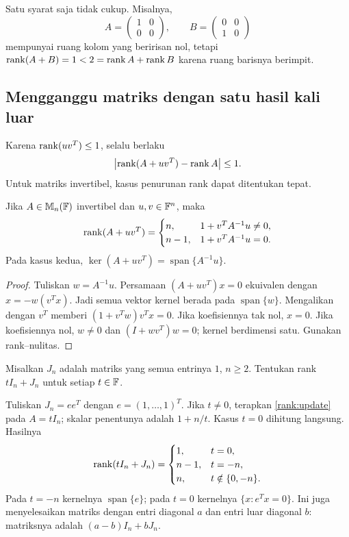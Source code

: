 Satu syarat saja tidak cukup. Misalnya,
\[
    A=\begin{pmatrix}1&0\\0&0\end{pmatrix},\qquad
    B=\begin{pmatrix}0&0\\1&0\end{pmatrix}
\]
mempunyai ruang kolom yang beririsan nol, tetapi
$\operatorname{rank}(A+B)=1<2=\operatorname{rank} A+\operatorname{rank} B$ karena ruang barisnya berimpit.

\subsection{Mengganggu matriks dengan satu hasil kali luar}

Karena $\operatorname{rank}(uv^T)\le1$, selalu berlaku
\[
    \bigl|\operatorname{rank}(A+uv^T)-\operatorname{rank} A\bigr|\le1.
\]
Untuk matriks invertibel, kasus penurunan rank dapat ditentukan tepat.

\begin{prop}
    \label{rank:update}
    Jika $A\in\mathbb{M}_n(\mathbb{F})$ invertibel dan $u,v\in\mathbb{F}^n$, maka
    \[
        \operatorname{rank}(A+uv^T)=
        \begin{cases}
            n,&1+v^TA^{-1}u\ne0,\\
            n-1,&1+v^TA^{-1}u=0.
        \end{cases}
    \]
    Pada kasus kedua, $\ker(A+uv^T)=\operatorname{span}\{A^{-1}u\}$.
\end{prop}
\begin{proof}
    Tuliskan $w=A^{-1}u$. Persamaan $(A+uv^T)x=0$ ekuivalen dengan
    $x=-w(v^Tx)$. Jadi semua vektor kernel berada pada
    $\operatorname{span}\{w\}$. Mengalikan dengan $v^T$ memberi
    $(1+v^Tw)v^Tx=0$.
    Jika koefisiennya tak nol, $x=0$.
    Jika koefisiennya nol, $w\ne0$ dan $(I+wv^T)w=0$;
    kernel berdimensi satu. Gunakan rank--nulitas.
\end{proof}

\begin{exam}
    Misalkan $J_n$ adalah matriks yang semua entrinya $1$, $n\ge2$.
    Tentukan rank $tI_n+J_n$ untuk setiap $t\in\mathbb{F}$.
\end{exam}
\begin{solution}
    Tuliskan $J_n=ee^T$ dengan $e=(1,\ldots,1)^T$.
    Jika $t\ne0$, terapkan \autoref{rank:update} pada $A=tI_n$;
    skalar penentunya adalah $1+n/t$.
    Kasus $t=0$ dihitung langsung. Hasilnya
    \[
        \operatorname{rank}(tI_n+J_n)=
        \begin{cases}
            1,&t=0,\\
            n-1,&t=-n,\\
            n,&t\notin\{0,-n\}.
        \end{cases}
    \]
    Pada $t=-n$ kernelnya $\operatorname{span}\{e\}$; pada $t=0$
    kernelnya $\{x:e^Tx=0\}$.
    Ini juga menyelesaikan matriks dengan entri diagonal $a$ dan entri
    luar diagonal $b$: matriksnya adalah $(a-b)I_n+bJ_n$.
\end{solution}

